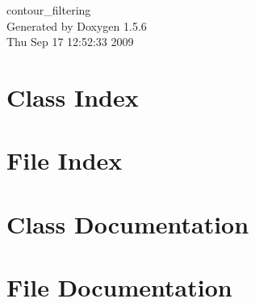 \documentclass[a4paper]{book}
\begin{document}
\begin{titlepage}
\vspace*{7cm}
\begin{center}
{\Large contour\_\-filtering }\\
\vspace*{1cm}
{\large Generated by Doxygen 1.5.6}\\
\vspace*{0.5cm}
{\small Thu Sep 17 12:52:33 2009}\\
\end{center}
\end{titlepage}
\clearemptydoublepage
{}
\tableofcontents
\clearemptydoublepage
{}
\chapter{Class Index}

\chapter{File Index}

\chapter{Class Documentation}









\chapter{File Documentation}




















\printindex
\end{document}
